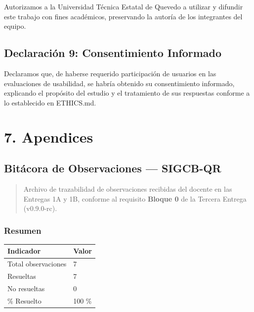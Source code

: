 \documentclass[
11pt,
a4paper,
]{report}
\begin{document}
	Autorizamos a la Universidad Técnica Estatal de Quevedo a utilizar y difundir este trabajo con fines académicos, preservando la autoría de los integrantes del equipo.
	
	\hypertarget{declaracion-9-consentimiento}{%
		\section{Declaración 9: Consentimiento Informado}\label{declaracion-9-consentimiento}}
	
	Declaramos que, de haberse requerido participación de usuarios en las evaluaciones de usabilidad, se habría obtenido su consentimiento informado, explicando el propósito del estudio y el tratamiento de sus respuestas conforme a lo establecido en ETHICS.md.
	
	\hypertarget{apendices}{%
		\chapter{7. Apendices}\label{apendices}}
	
	\hypertarget{bituxe1cora-de-observaciones-sigcb-qr}{%
		\section{Bitácora de Observaciones --- SIGCB-QR}\label{bituxe1cora-de-observaciones-sigcb-qr}}
	
	\begin{quote}
		Archivo de trazabilidad de observaciones recibidas del docente en las Entregas 1A y 1B,
		conforme al requisito \textbf{Bloque 0} de la Tercera Entrega (v0.9.0-rc).
	\end{quote}
	
	\hypertarget{resumen-1}{%
		\subsection{Resumen}\label{resumen-1}}
	
	\begin{longtable}[]{@{}ll@{}}
		\toprule\noalign{}
		Indicador & Valor \\
		\midrule\noalign{}
		\endhead
		\bottomrule\noalign{}
		\endlastfoot
		Total observaciones & 7 \\
		Resueltas & 7 \\
		No resueltas & 0 \\
		\% Resuelto & 100 \% \\
	\end{longtable}
	
\end{document}
